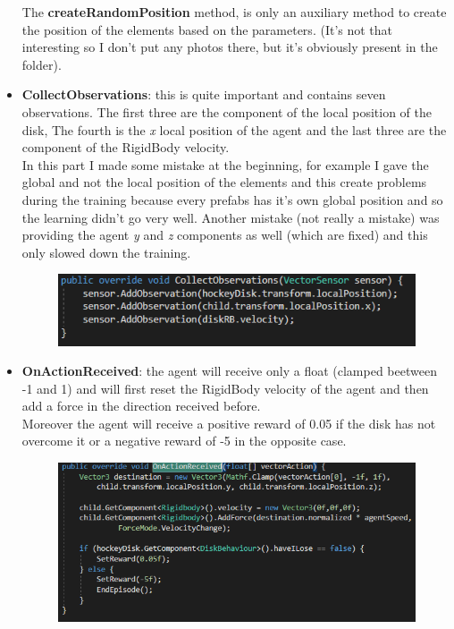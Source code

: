 \documentclass[12pt]{article}
\begin{document}
\begin{itemize}
		The \textbf{createRandomPosition} method, is only an auxiliary method to create the position of the elements based on the parameters. (It's not that interesting so I don't put any photos there, but it's obviously present in the folder).
		
		\item \textbf{CollectObservations}: this is quite important and contains seven observations. The first three are the component of the local position of the disk, The fourth is the \textit{x} local position of the agent and the last three are the component of the RigidBody velocity.\\
		In this part I made some mistake at the beginning, for example I gave the global and not the local position of the elements and this create problems during the training because every prefabs has it's own global position and so the learning didn't go very well. Another mistake (not really a mistake) was providing the agent \textit{y} and \textit{z} components as well (which are fixed) and this only slowed down the training.
		
		\begin{figure}[hbt!]
			\centering
			\includegraphics[width= 1
			\textwidth]{images/CollectObservation.png}
		\end{figure}
	
		\item \textbf{OnActionReceived}: the agent will receive only a float (clamped beetween -1 and 1) and will first reset the RigidBody velocity of the agent and then add a force in the direction received before. \\
		Moreover the agent will receive a positive reward of 0.05 if the disk has not overcome it or a negative reward of -5 in the opposite case.
		
		\newpage
		
		\begin{figure}[hbt!]
			\centering
			\includegraphics[width= 1
			\textwidth]{images/OnActionReceived.png}
		\end{figure}
		
	\end{itemize}	
	
\end{document}
